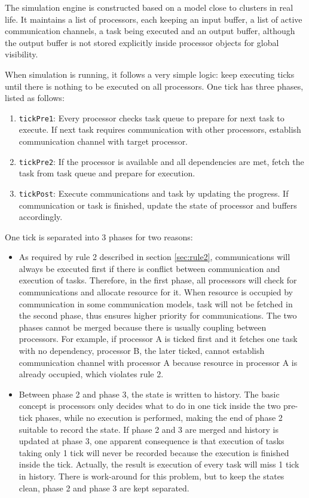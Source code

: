 \documentclass[msc,deptreport, cs]{infthesis}
\begin{document}
The simulation engine is constructed based on a model close to clusters in real life. It maintains a list of processors, each keeping an input buffer, a list of active communication channels, a task being executed and an output buffer, although the output buffer is not stored explicitly inside processor objects for global visibility.

When simulation is running, it follows a very simple logic: keep executing ticks until there is nothing to be executed on all processors. One tick has three phases, listed as follows:

\begin{enumerate}
  \item \verb+tickPre1+: Every processor checks task queue to prepare for next task to execute. If next task requires communication with other processors, establish communication channel with target processor.
  \item \verb+tickPre2+: If the processor is available and all dependencies are met, fetch the task from task queue and prepare for execution.
  \item \verb+tickPost+: Execute communications and task by updating the progress. If communication or task is finished, update the state of processor and buffers accordingly.
\end{enumerate}

One tick is separated into 3 phases for two reasons:

\begin{itemize}
  \item As required by rule 2 described in section \ref{sec:rule2}, communications will always be executed first if there is conflict between communication and execution of tasks. Therefore, in the first phase, all processors will check for communications and allocate resource for it. When resource is occupied by communication in some communication models, task will not be fetched in the second phase, thus ensures higher priority for communications. The two phases cannot be merged because there is usually coupling between processors. For example, if processor A is ticked first and it fetches one task with no dependency, processor B, the later ticked, cannot establish communication channel with processor A because resource in processor A is already occupied, which violates rule 2.
  \item Between phase 2 and phase 3, the state is written to history. The basic concept is processors only decides what to do in one tick inside the two pre-tick phases, while no execution is performed, making the end of phase 2 suitable to record the state. If phase 2 and 3 are merged and history is updated at phase 3, one apparent consequence is that execution of tasks taking only 1 tick will never be recorded because the execution is finished inside the tick. Actually, the result is execution of every task will miss 1 tick in history. There is work-around for this problem, but to keep the states clean, phase 2 and phase 3 are kept separated.
\end{itemize}
\end{document}
